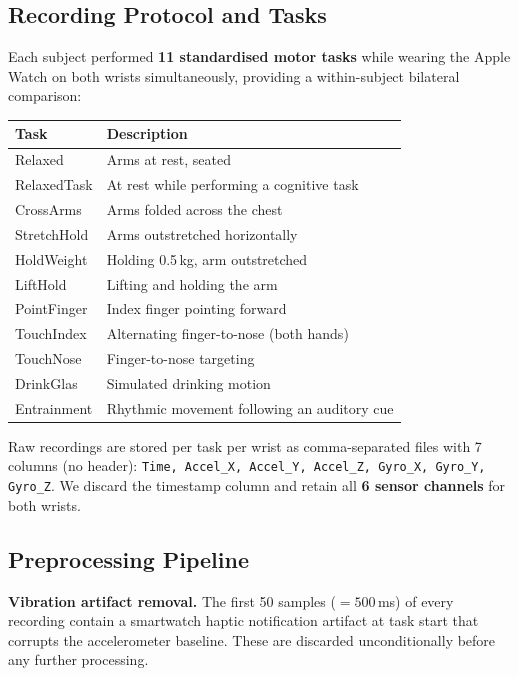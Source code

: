 \documentclass{article}
\begin{document}
\subsection{Recording Protocol and Tasks}

Each subject performed \textbf{11 standardised motor tasks} while wearing the
Apple Watch on both wrists simultaneously, providing a within-subject bilateral
comparison:

\begin{center}
\begin{tabular}{ll}
\toprule
\textbf{Task} & \textbf{Description} \\
\midrule
Relaxed & Arms at rest, seated \\
RelaxedTask & At rest while performing a cognitive task \\
CrossArms & Arms folded across the chest \\
StretchHold & Arms outstretched horizontally \\
HoldWeight & Holding 0.5\,kg, arm outstretched \\
LiftHold & Lifting and holding the arm \\
PointFinger & Index finger pointing forward \\
TouchIndex & Alternating finger-to-nose (both hands) \\
TouchNose & Finger-to-nose targeting \\
DrinkGlas & Simulated drinking motion \\
Entrainment & Rhythmic movement following an auditory cue \\
\bottomrule
\end{tabular}
\end{center}

Raw recordings are stored per task per wrist as comma-separated files with
7 columns (no header): \texttt{Time, Accel\_X, Accel\_Y, Accel\_Z,
Gyro\_X, Gyro\_Y, Gyro\_Z}.
We discard the timestamp column and retain all \textbf{6 sensor channels} for
both wrists.

\subsection{Preprocessing Pipeline}

\textbf{Vibration artifact removal.}
The first 50 samples ($= 500$\,ms) of every recording contain a smartwatch
haptic notification artifact at task start that corrupts the accelerometer
baseline.
These are discarded unconditionally before any further processing.
\end{document}
